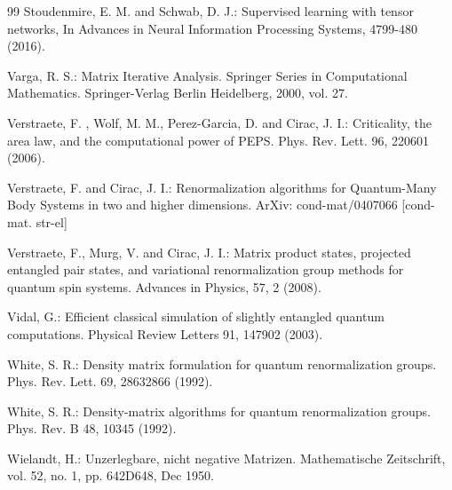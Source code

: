 \documentclass[smallextended]{svjour3}
\renewcommand{\1}{\mathbbm{1}}
\begin{document}
\begin{thebibliography}{99}
      Stoudenmire, E. M. and   Schwab, D. J.: Supervised learning with tensor networks, In Advances in Neural Information Processing Systems, 4799-480 (2016).



      Varga, R. S.: Matrix Iterative Analysis. Springer Series in Computational Mathematics. Springer-Verlag Berlin Heidelberg, 2000, vol. 27.

     Verstraete, F. ,  Wolf, M. M.,  Perez-Garcia, D. and  Cirac, J. I.: Criticality, the area law, and the computational power of PEPS. Phys. Rev. Lett. 96, 220601 (2006).

     Verstraete, F.  and  Cirac, J. I.: Renormalization algorithms for Quantum-Many Body Systems in two and higher dimensions. ArXiv: cond-mat/0407066 [cond-mat. str-el]

      Verstraete, F., Murg,  V. and  Cirac,  J. I.: Matrix product states, projected entangled pair states, and variational renormalization group methods for quantum spin systems. Advances in Physics, 57, 2 (2008).


      Vidal, G.: Efficient classical simulation of slightly entangled quantum computations. Physical Review Letters 91, 147902 (2003).

      White, S. R.: Density matrix formulation for quantum renormalization groups.  Phys. Rev. Lett. 69, 28632866 (1992).

     White, S. R.: Density-matrix algorithms for quantum renormalization groups. Phys. Rev. B 48, 10345 (1992).


      Wielandt, H.: Unzerlegbare, nicht negative Matrizen. Mathematische Zeitschrift, vol. 52, no. 1, pp. 642D648, Dec 1950.


\end{thebibliography}
\end{document}
